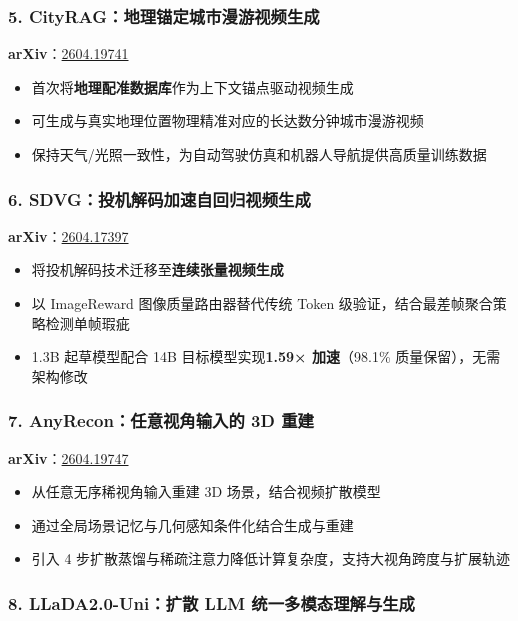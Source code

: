 \subsubsection{5. CityRAG：地理锚定城市漫游视频生成}

\textbf{arXiv}：\href{https://arxiv.org/abs/2604.19741}{2604.19741}

\begin{itemize}[leftmargin=1.5em]
  \item 首次将\textbf{地理配准数据库}作为上下文锚点驱动视频生成
  \item 可生成与真实地理位置物理精准对应的长达数分钟城市漫游视频
  \item 保持天气/光照一致性，为自动驾驶仿真和机器人导航提供高质量训练数据
\end{itemize}

\subsubsection{6. SDVG：投机解码加速自回归视频生成}

\textbf{arXiv}：\href{https://arxiv.org/abs/2604.17397}{2604.17397}

\begin{itemize}[leftmargin=1.5em]
  \item 将投机解码技术迁移至\textbf{连续张量视频生成}
  \item 以 ImageReward 图像质量路由器替代传统 Token 级验证，结合最差帧聚合策略检测单帧瑕疵
  \item 1.3B 起草模型配合 14B 目标模型实现\textbf{1.59× 加速}（98.1\% 质量保留），无需架构修改
\end{itemize}

\subsubsection{7. AnyRecon：任意视角输入的 3D 重建}

\textbf{arXiv}：\href{https://arxiv.org/abs/2604.19747}{2604.19747}

\begin{itemize}[leftmargin=1.5em]
  \item 从任意无序稀视角输入重建 3D 场景，结合视频扩散模型
  \item 通过全局场景记忆与几何感知条件化结合生成与重建
  \item 引入 4 步扩散蒸馏与稀疏注意力降低计算复杂度，支持大视角跨度与扩展轨迹
\end{itemize}

\subsubsection{8. LLaDA2.0-Uni：扩散 LLM 统一多模态理解与生成}


